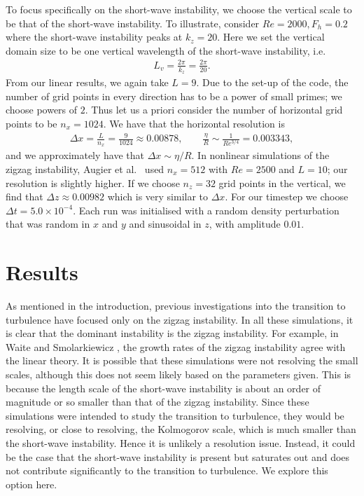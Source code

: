 To focus specifically on the short-wave instability, we choose the vertical scale to be that of the short-wave instability. To illustrate, consider $Re=2000, F_{h}=0.2$ where the short-wave instability peaks at $k_{z}=20$. Here we set the vertical domain size to be one vertical wavelength of the short-wave instability, i.e.
\begin{align}
L_{v} = \frac{2\pi}{k_{z}} = \frac{2\pi}{20}.
\end{align}
From our linear results, we again take $L=9$. Due to the set-up of the code, the number of grid points in every direction has to be a power of small primes; we choose powers of $2$. Thus let us a priori consider the number of horizontal grid points to be $n_{x}=1024$. We have that the horizontal resolution is
\begin{align}
\Delta x = \frac{L}{n_{x}} = \frac{9}{1024}\approx 0.00878,\qquad \frac{\eta}{R}\sim \frac{1}{Re^{3/4}}=0.003343,
\end{align}
and we approximately have that $\Delta x \sim \eta/R$. In nonlinear simulations of the zigzag instability, Augier et al.\ \cite{augierbillant2011} used $n_{x}=512$ with $Re=2500$ and $L=10$; our resolution is slightly higher. If we choose $n_{z}=32$ grid points in the vertical, we find that $\Delta z \approx 0.00982$ which is very similar to $\Delta x$. For our timestep we choose $\Delta t = 5.0\times 10^{-4}$. Each run was initialised with a random density perturbation that was random in $x$ and $y$ and sinusoidal in $z$, with amplitude $0.01$. 

\section{Results}
As mentioned in the introduction, previous investigations into the transition to turbulence have focused only on the zigzag instability. In all these simulations, it is clear that the dominant instability is the zigzag instability. For example, in Waite and Smolarkiewicz \cite{waitesmol2008}, the growth rates of the zigzag instability agree with the linear theory. It is possible that these simulations were not resolving the small scales, although this does not seem likely based on the parameters given. This is because the length scale of the short-wave instability is about an order of magnitude or so smaller than that of the zigzag instability. Since these simulations were intended to study the transition to turbulence, they would be resolving, or close to resolving, the Kolmogorov scale, which is much smaller than the short-wave instability. Hence it is unlikely a resolution issue. Instead, it could be the case that the short-wave instability is present but saturates out and does not contribute significantly to the transition to turbulence. We explore this option here. 

